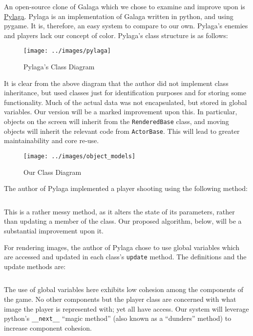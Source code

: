 An open-source clone of Galaga which we chose to examine and improve
upon is \href{https://code.google.com/archive/p/pylaga/source/default/source}{Pylaga}.
Pylaga is an implementation of Galaga written in python, and using
pygame.  It is, therefore, an easy system to compare to our own.
Pylaga's enemies and players lack our concept of color.  Pylaga's
class structure is as follows:

\begin{figure*}
    \texttt{[image: ../images/pylaga]}
    \caption{Pylaga's Class Diagram}
\end{figure*}

It is clear from the above diagram that the author did not implement
class inheritance, but used classes just for identification purposes
and for storing some functionality.  Much of the actual data was not
encapsulated, but stored in global variables.  Our version will be a
marked improvement upon this. In particular, objects on the screen
will inherit from the \texttt{RenderedBase} class, and
moving objects will inherit the relevant code from
\texttt{ActorBase}.  This will lead to greater maintainability
and core re-use.

\begin{figure*}
    \texttt{[image: ../images/object\_models]}
    \caption{Our Class Diagram}
\end{figure*}

The author of Pylaga implemented a player shooting using the following
method:

\inputminted[baselinestretch=1]{python}{../code/pylaga_player.py}

This is a rather messy method, as it alters the state of its parameters,
rather than updating a member of the class.  Our proposed algorithm,
below, will be a substantial improvement upon it.

For rendering images, the author of Pylaga chose to use global variables
which are accessed and updated in each class's \texttt{update}
method.  The definitions and the update methods are:

\inputminted[baselinestretch=1]{python}{../code/pylaga_images_and_update.py}

The use of global variables here exhibits low cohesion among the
components of the game.  No other components but the player class
are concerned with what image the player is represented with; yet
all have access.  Our system will leverage python's \texttt{__next__}
``magic method'' (also known as a ``dunders'' method) to increase component
cohesion.

